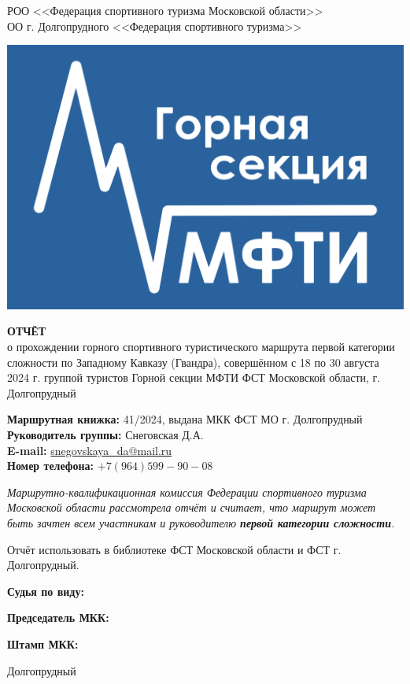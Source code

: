 \begin{titlepage}
\setlength\parindent{0pt}
	\begin{center}
		\large{РОО <<Федерация спортивного туризма Московской области>>\\
		ОО г. Долгопрудного <<Федерация спортивного туризма>>\\}
	\end{center}

	


	
	\begin{center}
		\includegraphics[width=0.4\linewidth]{../pics/Flag_GS-2}
		
		\Large{\bfseries{ОТЧЁТ}} \\
		\normalsize о прохождении горного спортивного туристического маршрута первой категории сложности по Западному Кавказу (Гвандра), совершённом с 18 по 30 августа 2024 г. группой туристов Горной секции МФТИ ФСТ Московской области, г. Долгопрудный
	\end{center}
	\vspace{1.8 cm}
	
	\textbf{Маршрутная книжка:} 41/2024, выдана МКК ФСТ МО г. Долгопрудный \\ 
	\textbf{Руководитель группы:} Снеговская Д.А.\\
	\textbf{E-mail:} \href{mailto: snegovskaya\_da@mail.ru}{snegovskaya\_da@mail.ru}\\
	\textbf{Номер телефона:} $+7(964)599-90-08$
	
	\vspace{1cm}
	
	\textit{Маршрутно-квалификационная комиссия Федерации спортивного туризма Московской области рассмотрела отчёт и считает, что маршрут может быть зачтен всем участникам и руководителю \textbf{первой категории сложности}.}

	\vspace{1cm}
	
	Отчёт использовать в библиотеке ФСТ Московской области и ФСТ г. Долгопрудный.
	
	\vspace{1cm}
	
	\textbf{Судья по виду:}
	
	\textbf{Председатель МКК:}
	
	\textbf{Штамп МКК:}
	
	\vfill
	\begin{center}
		Долгопрудный   \the\year{}
	\end{center}
\end{titlepage}
